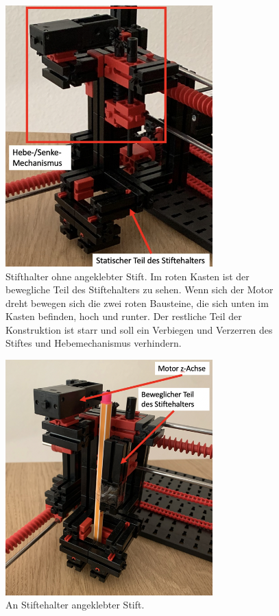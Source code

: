 \documentclass[conference,compsoc,final,a4paper]{IEEEtran}
\begin{document}
\begin{figure}[h]
\centering
\includegraphics[width=8cm]{../images/zAchse2.png}
\caption{Stifthalter ohne angeklebter Stift. Im roten Kasten ist der bewegliche Teil des Stiftehalters zu sehen. Wenn sich der Motor dreht bewegen sich die zwei roten Bausteine, die 
sich unten im Kasten befinden, hoch und runter. Der restliche Teil der Konstruktion ist starr und soll ein Verbiegen und Verzerren des Stiftes und Hebemechanismus verhindern.}
\label{fig:AufbauzAchse2}
\end{figure}

\begin{figure}[h]
\centering
\includegraphics[width=8cm]{../images/zAchse1.png}
\caption{An Stiftehalter angeklebter Stift. }
\label{fig:AufbauzAchse1}
\end{figure}
\end{document}
